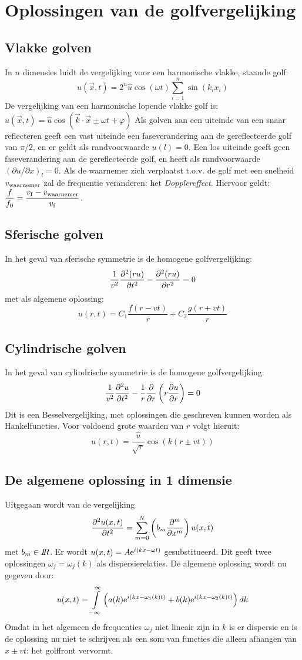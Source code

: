 \documentclass[twoside]{report}
\begin{document}
\section{Oplossingen van de golfvergelijking}
\subsection{Vlakke golven}
In $n$ dimensies luidt de vergelijking voor een harmonische vlakke, staande
golf:
\[
u(\vec{x},t)=2^n\hat{u}\cos(\omega t)\sum_{i=1}^n\sin(k_ix_i)
\]
De vergelijking van een harmonische lopende vlakke golf is:
$u(\vec{x},t)=\hat{u}\cos(\vec{k}\cdot\vec{x}\pm\omega t+\varphi)$
\npar
Als golven aan een uiteinde van een snaar reflecteren geeft een vast uiteinde
een faseverandering aan de gereflecteerde golf van $\pi/2$, en er geldt als
randvoorwaarde $u(l)=0$. Een los uiteinde geeft geen faseverandering aan de
gereflecteerde golf, en heeft als randvoorwaarde $(\partial u/\partial x)_l=0$.
\npar
Als de waarnemer zich verplaatst t.o.v. de golf met een snelheid $v_{\rm waarnemer}$
zal de frequentie veranderen: het {\it Dopplereffect}. Hiervoor geldt:
$\displaystyle\frac{f}{f_0}=\frac{v_{\rm f}-v_{\rm waarnemer}}{v_{\rm f}}$.

\subsection{Sferische golven}
In het geval van sferische symmetrie is de homogene golfvergelijking:
\[
\frac{1}{v^2}\frac{\partial^2 (ru)}{\partial t^2}-\frac{\partial^2 (ru)}{\partial r^2}=0
\]
met als algemene oplossing:
\[
u(r,t)=C_1\frac{f(r-vt)}{r}+C_2\frac{g(r+vt)}{r}
\]
\subsection{Cylindrische golven}
In het geval van cylindrische symmetrie is de homogene  golfvergelijking:
\[
\frac{1}{v^2}\frac{\partial^2 u}{\partial t^2}-\frac{1}{r}\frac{\partial }{\partial r}\left(r\frac{\partial u}{\partial r}\right)=0
\]
Dit is een Besselvergelijking, met oplossingen die geschreven kunnen worden
als Hankelfuncties. Voor voldoend grote waarden van $r$ volgt hieruit:
\[
u(r,t)=\frac{\hat{u}}{\sqrt{r}}\cos(k(r\pm vt))
\]
\subsection{De algemene oplossing in 1 dimensie}
Uitgegaan wordt van de vergelijking
\[
\frac{\partial^2 u(x,t)}{\partial t^2}=\sum_{m=0}^{N}\left(b_m\frac{\partial ^m}{\partial x^m}\right)u(x,t)
\]
met $b_m\in I\hspace{-1mm}R$. Er wordt $u(x,t)=A{\rm e}^{i(kx-\omega t)}$ gesubstitueerd.
Dit geeft twee oplossingen $\omega_j=\omega_j(k)$ als dispersierelaties. De
algemene oplossing wordt nu gegeven door:
\[
u(x,t)=\int\limits_{-\infty}^{\infty}\left(a(k){\rm e}^{i(kx-\omega_1(k)t)}+
b(k){\rm e}^{i(kx-\omega_2(k)t)}\right)dk
\]
Omdat in het algemeen de frequenties $\omega_j$ niet lineair zijn in $k$ is er
dispersie en is de oplossing nu niet te schrijven als een som van functies die
alleen afhangen van $x\pm vt$: het golffront vervormt.
\end{document}
